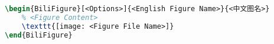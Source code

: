 \begin{lstlisting}[language=LaTeX, caption=Bilingual Figure, label=listing:bilingual-figure]
\begin{BiliFigure}[<Options>]{<English Figure Name>}{<中文图名>}
    % <Figure Content>
    \texttt{[image: <Figure File Name>]}
\end{BiliFigure}
\end{lstlisting}